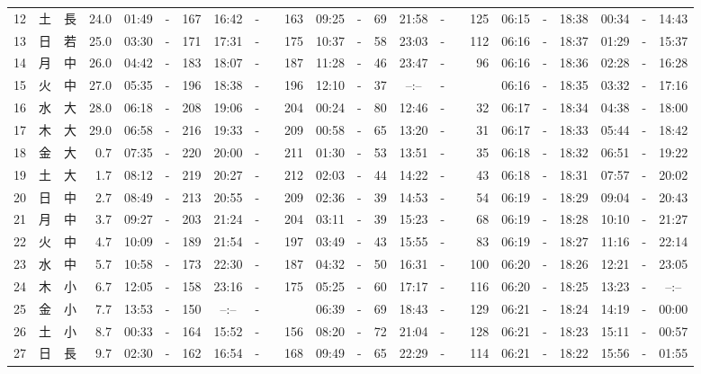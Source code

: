 \documentclass[12pt,a4j]{jsarticle}
\begin{document}
\begin{table}[htbp]
\begin{center}
{\begin{tabular}{|rc|cr|ccrccr|ccrccr|ccc|ccc|}
12 & 土 & 長 & 24.0 &  01:49 &-& 167 &  16:42 &-& 163 &  09:25 &-&  69 &  21:58 &-& 125 & 06:15 & -& 18:38 & 00:34 & -& 14:43 \\
13 & 日 & 若 & 25.0 &  03:30 &-& 171 &  17:31 &-& 175 &  10:37 &-&  58 &  23:03 &-& 112 & 06:16 & -& 18:37 & 01:29 & -& 15:37 \\
14 & 月 & 中 & 26.0 &  04:42 &-& 183 &  18:07 &-& 187 &  11:28 &-&  46 &  23:47 &-&  96 & 06:16 & -& 18:36 & 02:28 & -& 16:28 \\
15 & 火 & 中 & 27.0 &  05:35 &-& 196 &  18:38 &-& 196 &  12:10 &-&  37 &  --:-- &-&~~~~~ & 06:16 & -& 18:35 & 03:32 & -& 17:16 \\
16 & 水 & 大 & 28.0 &  06:18 &-& 208 &  19:06 &-& 204 &  00:24 &-&  80 &  12:46 &-&  32 & 06:17 & -& 18:34 & 04:38 & -& 18:00 \\
17 & 木 & 大 & 29.0 &  06:58 &-& 216 &  19:33 &-& 209 &  00:58 &-&  65 &  13:20 &-&  31 & 06:17 & -& 18:33 & 05:44 & -& 18:42 \\
18 & 金 & 大 &  0.7 &  07:35 &-& 220 &  20:00 &-& 211 &  01:30 &-&  53 &  13:51 &-&  35 & 06:18 & -& 18:32 & 06:51 & -& 19:22 \\
19 & 土 & 大 &  1.7 &  08:12 &-& 219 &  20:27 &-& 212 &  02:03 &-&  44 &  14:22 &-&  43 & 06:18 & -& 18:31 & 07:57 & -& 20:02 \\
20 & 日 & 中 &  2.7 &  08:49 &-& 213 &  20:55 &-& 209 &  02:36 &-&  39 &  14:53 &-&  54 & 06:19 & -& 18:29 & 09:04 & -& 20:43 \\
21 & 月 & 中 &  3.7 &  09:27 &-& 203 &  21:24 &-& 204 &  03:11 &-&  39 &  15:23 &-&  68 & 06:19 & -& 18:28 & 10:10 & -& 21:27 \\
22 & 火 & 中 &  4.7 &  10:09 &-& 189 &  21:54 &-& 197 &  03:49 &-&  43 &  15:55 &-&  83 & 06:19 & -& 18:27 & 11:16 & -& 22:14 \\
23 & 水 & 中 &  5.7 &  10:58 &-& 173 &  22:30 &-& 187 &  04:32 &-&  50 &  16:31 &-& 100 & 06:20 & -& 18:26 & 12:21 & -& 23:05 \\
24 & 木 & 小 &  6.7 &  12:05 &-& 158 &  23:16 &-& 175 &  05:25 &-&  60 &  17:17 &-& 116 & 06:20 & -& 18:25 & 13:23 & -& --:-- \\
25 & 金 & 小 &  7.7 &  13:53 &-& 150 &  --:-- &-&~~~~~ &  06:39 &-&  69 &  18:43 &-& 129 & 06:21 & -& 18:24 & 14:19 & -& 00:00 \\
26 & 土 & 小 &  8.7 &  00:33 &-& 164 &  15:52 &-& 156 &  08:20 &-&  72 &  21:04 &-& 128 & 06:21 & -& 18:23 & 15:11 & -& 00:57 \\
27 & 日 & 長 &  9.7 &  02:30 &-& 162 &  16:54 &-& 168 &  09:49 &-&  65 &  22:29 &-& 114 & 06:21 & -& 18:22 & 15:56 & -& 01:55 \\

\end{tabular}}
\end{center}
\end{table}
\end{document}
